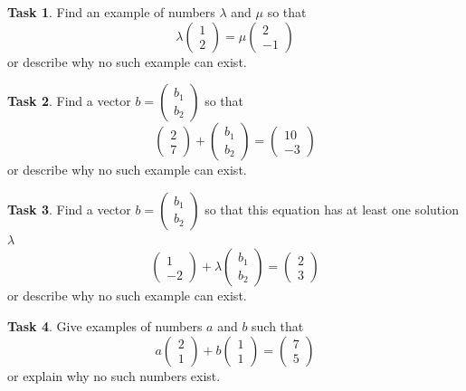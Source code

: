 \documentclass[10pt,]{book}
\theoremstyle{plain}
\theoremstyle{definition}
\numberwithin{equation}{section}
\newtheorem{task}{Task}[chapter]
\begin{document}
\begin{task}
\label{task-1}
Find an example of numbers \(\lambda\) and \(\mu\) so that \[\lambda \begin{pmatrix} 1 \\ 2 \end{pmatrix} = \mu \begin{pmatrix} 2 \\ -1 \end{pmatrix}\] or describe why no such example can exist.%
\end{task}
\begin{task}
\label{task-2}
Find a vector \(b = \left( \begin{smallmatrix} b_1 \\ b_2
                  \end{smallmatrix} \right)\) so that \[ \begin{pmatrix} 2
                  \\ 7 \end{pmatrix} + \begin{pmatrix} b_1 \\ b_2 \end{pmatrix}
                  = \begin{pmatrix} 10 \\ -3 \end{pmatrix}\] or describe why
                  no such example can exist.%
\end{task}
\begin{task}
\label{task-3}
Find a vector \(b = \left( \begin{smallmatrix} b_1 \\ b_2
                  \end{smallmatrix} \right)\) so that this equation has at
                  least one solution \(\lambda\) \[\begin{pmatrix} 1 \\ -2
                  \end{pmatrix} + \lambda \begin{pmatrix} b_1 \\ b_2 \end{pmatrix}
                  = \begin{pmatrix} 2 \\ 3 \end{pmatrix}\] or describe why no
                  such example can exist.%
\end{task}
\begin{task}
\label{task-4}
Give examples of numbers \(a\) and \(b\) such that \[ a \begin{pmatrix} 2 \\ 1 \end{pmatrix} + b \begin{pmatrix} 1 \\ 1 \end{pmatrix} = \begin{pmatrix} 7 \\ 5 \end{pmatrix}\] or explain why no such numbers exist.%
\end{task}
\end{document}
